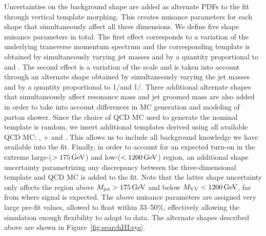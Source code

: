 Uncertainties on the background shape are added as alternate PDFs to the fit through vertical template morphing. This creates nuisance parameters for each shape that simultaneously affect all three dimensions. We define five shape nuisance parameters in total. The first effect corresponds to a variation of the underlying transverse momentum spectrum and the corresponding template is obtained by simultaneously varying jet masses and \MVV by a quantity proportional to \MVV and \MJ. The second effect is a variation of the scale and is taken into account through an alternate shape obtained by simultaneously varying the jet masses and \MVV by a quantity proportional to 1/\MVV and 1/\MJ.
Three additional alternate shapes that simultaneously affect resonance mass and jet groomed mass are also added in order to take into account differences in MC generation and modeling of parton shower. Since the choice of QCD MC used to generate the nominal template is random, we insert additional templates derived using all available QCD MC: \HERWIG{++}, \MADGRAPH{}+ and \POWHEG{}. This allows us to include all background knowledge we have available into the fit. Finally, in order to account for an expected \MVV turn-on in the extreme large-\MJ ($>175 \,\text{Ge\hspace{-.08em}V}$) and low-\MVV($<1200 \,\text{Ge\hspace{-.08em}V}$) region, an additional shape uncertainty parametrizing any discrepancy between the three-dimensional template and QCD MC is added to the fit. Note that the latter shape uncertainty only affects the region above $M_{\rm jet} >175 \,\text{Ge\hspace{-.08em}V}$ and below $M_{\rm VV}<1200 \,\text{Ge\hspace{-.08em}V}$, far from where signal is expected.
The above nuisance parameters are assigned very large pre-fit values, allowed to float within 33--50\%, effectively allowing the simulation enough flexibility to adapt to data. The alternate shapes described above are shown in Figure~\ref{fig:searchIII:sys}.
